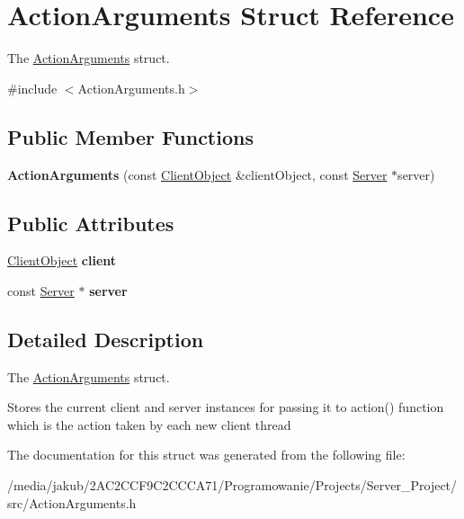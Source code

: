 \hypertarget{structActionArguments}{}\section{Action\+Arguments Struct Reference}
\label{structActionArguments}


The \hyperlink{structActionArguments}{Action\+Arguments} struct.  




{\ttfamily \#include $<$Action\+Arguments.\+h$>$}

\subsection*{Public Member Functions}
\begin{DoxyCompactItemize}
\item 
\mbox{\label{structActionArguments_a422c523f86300cd0cdb608ec7c1eac9c}} 
{\bfseries Action\+Arguments} (const \hyperlink{classClientObject}{Client\+Object} \&client\+Object, const \hyperlink{classServer}{Server} $\ast$server)
\end{DoxyCompactItemize}
\subsection*{Public Attributes}
\begin{DoxyCompactItemize}
\item 
\mbox{\label{structActionArguments_a4e375ff0177e8f656b5d33192906df03}} 
\hyperlink{classClientObject}{Client\+Object} {\bfseries client}
\item 
\mbox{\label{structActionArguments_ae7e34b5fb4bd287d2303e2ccf3e1c6bc}} 
const \hyperlink{classServer}{Server} $\ast$ {\bfseries server}
\end{DoxyCompactItemize}


\subsection{Detailed Description}
The \hyperlink{structActionArguments}{Action\+Arguments} struct. 

Stores the current client and server instances for passing it to action() function which is the action taken by each new client thread 

The documentation for this struct was generated from the following file\+:\begin{DoxyCompactItemize}
\item 
/media/jakub/2\+A\+C2\+C\+C\+F9\+C2\+C\+C\+C\+A71/\+Programowanie/\+Projects/\+Server\+\_\+\+Project/src/Action\+Arguments.\+h\end{DoxyCompactItemize}
